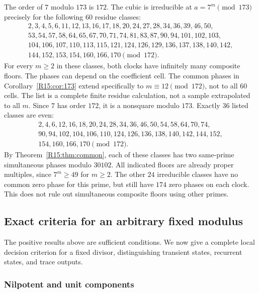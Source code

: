 \documentclass[11pt,a4paper]{article}
\theoremstyle{definition}\newtheorem{definition}[theorem]{Definition}
\theoremstyle{remark}\newtheorem{remark}[theorem]{Remark}
\begin{document}
The order of $7$ modulo $173$ is $172$. The cubic is irreducible at
$a=7^m\pmod{173}$ precisely for the following $60$ residue classes:
\begin{equation}\label{R15:eq:cells}
\begin{gathered}
2,3,4,5,6,11,12,13,16,17,18,20,24,27,28,34,36,39,46,50,\\
53,54,57,58,64,65,67,70,71,74,81,83,87,90,94,101,102,103,\\
104,106,107,110,113,115,121,124,126,129,136,137,138,140,142,\\
144,152,153,154,160,166,170 \pmod{172}.
\end{gathered}
\end{equation}
For every $m\ge2$ in these classes, both clocks have infinitely many
composite floors. The phases can depend on the coefficient cell.
The common phases in Corollary~\ref{R15:cor:173} extend specifically to
$m\equiv12\pmod{172}$, not to all $60$ cells. The list is a complete
finite residue calculation, not a sample extrapolated to all $m$.
Since $7$ has order $172$, it is a nonsquare modulo $173$.
Exactly $36$ listed classes are even:
\[
\begin{gathered}
2,4,6,12,16,18,20,24,28,34,36,46,50,54,58,64,70,74,\\
90,94,102,104,106,110,124,126,136,138,140,142,144,152,\\
154,160,166,170\pmod{172}.
\end{gathered}
\]
By Theorem~\ref{R15:thm:common}, each of these classes has two same-prime
simultaneous phases modulo $30102$. All indicated floors are already
proper multiples, since $7^m\ge49$ for $m\ge2$.
The other $24$ irreducible classes have no common zero phase for
this prime, but still have $174$ zero phases on each clock.
This does not rule out simultaneous composite floors using other primes.

\subsection{Exact criteria for an arbitrary fixed modulus}

The positive results above are sufficient conditions. We now give a complete
local decision criterion for a fixed divisor, distinguishing transient
states, recurrent states, and trace outputs.

\subsubsection{Nilpotent and unit components}
\end{document}
